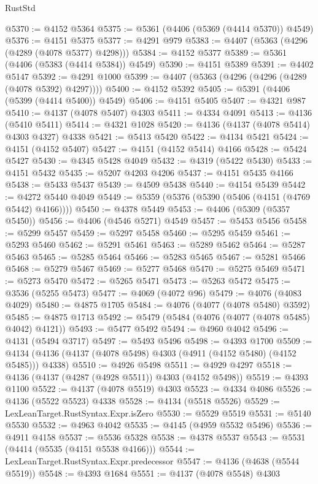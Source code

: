 \begin{lexlean}{RustStd}
\begin{coremodule}
{\begin{coremodule}
{{{{{{{{{{{{{{{{{{{{{{{{{{{{{{{{{{{{{{{{{{{{{{{{{{@5370 := @4152 @5364
@5375 := @5361 (@4406 (@5369 (@4414 @5370)) @4549)
@5376 := @4151 @5375
@5377 := @4291 @979
@5383 := @4407 (@5363 (@4296 (@4289 (@4078 @5377) @4298)))
@5384 := @4152 @5377
@5389 := @5361 (@4406 (@5383 (@4414 @5384)) @4549)
@5390 := @4151 @5389
@5391 := @4402 @5147
@5392 := @4291 @1000
@5399 := @4407 (@5363 (@4296 (@4296 (@4289 (@4078 @5392) @4297))))
@5400 := @4152 @5392
@5405 := @5391 (@4406 (@5399 (@4414 @5400)) @4549)
@5406 := @4151 @5405
@5407 := @4321 @987
@5410 := @4137 (@4078 @5407) @4303
@5411 := @4334 @4091
@5413 := @4136 (@5410 @5411)
@5414 := @4321 @1028
@5420 := @4136 (@4137 (@4078 @5414) @4303 @4327) @4338
@5421 := @5413 @5420
@5422 := @4134 @5421
@5424 := @4151 (@4152 @5407)
@5427 := @4151 (@4152 @5414) @4166
@5428 := @5424 @5427
@5430 := @4345 @5428 @4049
@5432 := @4319 (@5422 @5430)
@5433 := @4151 @5432
@5435 := @5207 @4203 @4206
@5437 := @4151 @5435 @4166
@5438 := @5433 @5437
@5439 := @4509 @5438
@5440 := @4154 @5439
@5442 := @4272 @5440 @4049
@5449 := @5359 (@5376 (@5390 (@5406 (@4151 (@4769 @5442) @4166))))
@5450 := @4378 @5449
@5453 := @4406 (@5309 (@5357 @5450))
@5456 := @4406 (@4546 @5271) @4549
@5457 := @5453 @5456
@5458 := @5299 @5457
@5459 := @5297 @5458
@5460 := @5295 @5459
@5461 := @5293 @5460
@5462 := @5291 @5461
@5463 := @5289 @5462
@5464 := @5287 @5463
@5465 := @5285 @5464
@5466 := @5283 @5465
@5467 := @5281 @5466
@5468 := @5279 @5467
@5469 := @5277 @5468
@5470 := @5275 @5469
@5471 := @5273 @5470
@5472 := @5265 @5471
@5473 := @5263 @5472
@5475 := @3536 (@5255 @5473)
@5477 := @4069 (@4072 @96)
@5479 := @4076 (@4083 @4029)
@5480 := @4875 @1705
@5484 := @4076 (@4077 (@4078 @5480) @3592)
@5485 := @4875 @1713
@5492 := @5479 (@5484 (@4076 (@4077 (@4078 @5485) @4042) @4121))
@5493 := @5477 @5492
@5494 := @4960 @4042
@5496 := @4131 (@5494 @3717)
@5497 := @5493 @5496
@5498 := @4393 @1700
@5509 := @4134 (@4136 (@4137 (@4078 @5498) @4303 (@4911 (@4152 @5480) (@4152 @5485))) @4338)
@5510 := @4926 @5498
@5511 := @4929 @4297
@5518 := @4136 (@4137 (@4287 (@4928 @5511)) @4303 (@4152 @5498))
@5519 := @4393 @1100
@5522 := @4137 (@4078 @5519) @4303
@5523 := @4334 @4086
@5526 := @4136 (@5522 @5523) @4338
@5528 := @4134 (@5518 @5526)
@5529 := LexLeanTarget.RustSyntax.Expr.isZero
@5530 := @5529 @5519
@5531 := @5140 @5530
@5532 := @4963 @4042
@5535 := @4145 (@4959 @5532 @5496)
@5536 := @4911 @4158
@5537 := @5536 @5328
@5538 := @4378 @5537
@5543 := @5531 (@4414 (@5535 (@4151 @5538 @4166)))
@5544 := LexLeanTarget.RustSyntax.Expr.predecessor
@5547 := @4136 (@4638 (@5544 @5519))
@5548 := @4393 @1684
@5551 := @4137 (@4078 @5548) @4303
}}}}}}}}}}}}}}}}}}}}}}}}}}}}}}}}}}}}}}}}}}}}}}}}}}
\end{coremodule}}
\end{coremodule}
\end{lexlean}
